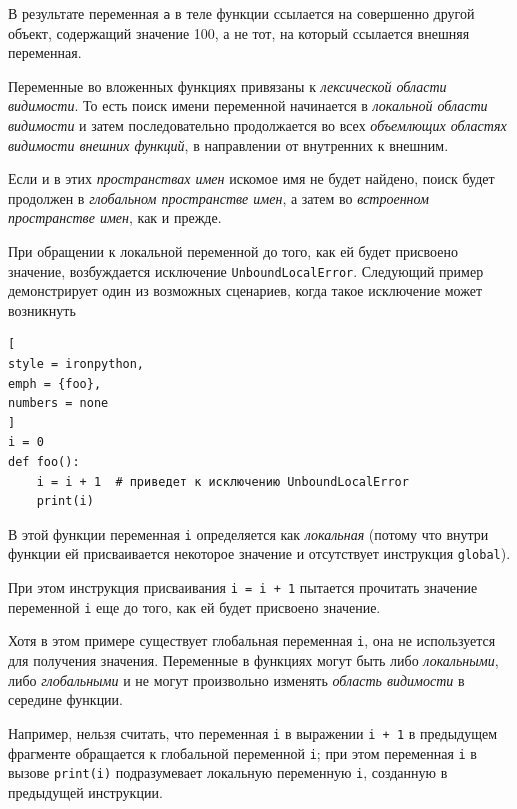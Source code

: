 \documentclass[%
	11pt,
	a4paper,
	utf8,
		]{article}
\begin{document}
В результате переменная \texttt{a} в теле функции ссылается на совершенно другой объект, содержащий значение 100, а не тот, на который ссылается внешняя переменная.

Переменные во вложенных функциях привязаны к \emph{лексической области видимости}. То есть поиск имени переменной начинается в \emph{локальной области видимости} и затем последовательно продолжается во всех \emph{объемлющих областях видимости внешних функций}, в направлении от внутренних к внешним.

Если и в этих \emph{пространствах имен} искомое имя не будет найдено, поиск будет продолжен в \emph{глобальном пространстве имен}, а затем во \emph{встроенном пространстве имен}, как и прежде.

При обращении к локальной переменной до того, как ей будет присвоено значение, возбуждается исключение \texttt{UnboundLocalError}. Следующий пример демонстрирует один из возможных сценариев, когда такое исключение может возникнуть

\begin{lstlisting}[
style = ironpython,
emph = {foo},
numbers = none
]
i = 0
def foo():
    i = i + 1  # приведет к исключению UnboundLocalError
    print(i)
\end{lstlisting}

В этой функции переменная \texttt{i} определяется как \emph{локальная} (потому что внутри функции ей присваивается некоторое значение и отсутствует инструкция \texttt{global}).

При этом инструкция присваивания \lstinline{i = i + 1} пытается прочитать значение переменной \texttt{i} еще до того, как ей будет присвоено значение.

Хотя в этом примере существует глобальная переменная \texttt{i}, она не используется для получения значения. Переменные в функциях могут быть либо \emph{локальными}, либо \emph{глобальными} и не могут произвольно изменять \emph{область видимости} в середине функции.


Например, нельзя считать, что переменная \texttt{i} в выражении \lstinline{i + 1} в предыдущем фрагменте обращается к глобальной переменной \texttt{i}; при этом переменная \texttt{i} в вызове \texttt{print(i)} подразумевает локальную переменную \texttt{i}, созданную в предыдущей инструкции.
\end{document}
